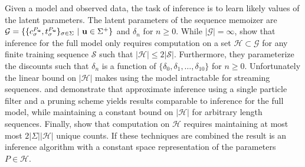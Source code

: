 
Given a model and observed data,  the task of inference is to learn likely values of the latent parameters.  The latent parameters of the sequence memoizer are  $\mathcal{G} = \{ \{ c^{P_{\bf u}}_\sigma, t^{P_{\bf u}}_\sigma \}_{\sigma \in \Sigma} \ | \ {\bf u} \in \Sigma^{+} \}$  and $\delta_n$ for $n \geq 0$.  While $| \mathcal{G}| = \infty$, \citep{Wood2009} show that inference for the full model only requires computation on a set $\mathcal{H} \subset \mathcal{G}$ for any finite training sequence $\mathcal{S}$ such that $|\mathcal{H} | \leq 2 |\mathcal{S}|$.  Furthermore, they parameterize the discounts such that $\delta_n$ is a function of $\{\delta_0, \delta_1, \ldots, \delta_{10} \}$ for $n \geq 0$.   Unfortunately the linear bound on $|\mathcal{H}|$ makes using the model intractable for streaming sequences. \citep{Bartlett2010} and \citep{Gasthaus2010} demonstrate that approximate inference using a single particle filter and a pruning scheme yields results comparable to inference for the full model, while maintaining a constant bound on $|\mathcal{H}| $ for arbitrary length sequences.  Finally, \cite{Gasthaus2011} show that computation on $\mathcal{H}$ requires maintaining at most most $2|\Sigma| |\mathcal{H}|$ unique counts.  If these techniques are combined the result is an inference algorithm with a constant space representation of the parameters $P \in \mathcal{H}$.  

